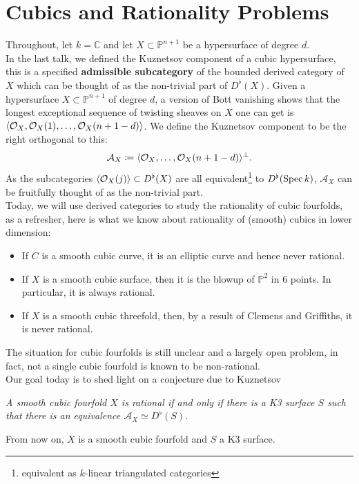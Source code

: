 \section{Cubics and Rationality Problems}
Throughout, let $k= \mathbb{C}$ and let $X \subset \mathbb{P}^{n+1}$ be a hypersurface of degree $d$.\\
In the last talk, we defined the Kuznetsov component of a cubic hypersurface, this is a specified \textbf{admissible subcategory} of the bounded derived category of $X$ which can be thought of as the non-trivial part of $D^{\flat}( X) $.
Given a hypersurface $X \subset \mathbb{P}^{n+1}$ of degree $d$, a version of Bott vanishing shows that the longest exceptional sequence of twisting sheaves on $X$ one can get is $\left\langle \mathcal{O}_X, \mathcal{O}_X( 1), \ldots, \mathcal{O}_X( n+1-d)\right\rangle  $. 
We define the Kuznetsov component to be the right orthogonal to this:
\[ 
\mathcal{A}_X \coloneq \langle \mathcal{O}_X,\ldots, \mathcal{O}_X( n+1-d) \rangle^{\perp}.
\]
As the subcategories $ \langle \mathcal{O}_X( j) \rangle \subset D^{\flat}( X) $ are all equivalent\footnote{equivalent as $k$-linear triangulated categories} to $D^{\flat}( \operatorname{Spec} k) $, $\mathcal{A}_X$ can be fruitfully thought of as the non-trivial part.\\
Today, we will use derived categories to study the rationality of cubic fourfolds, as a refresher, here is what we know about rationality of (smooth) cubics in lower dimension:
\begin{itemize}
\item If $C$ is a smooth cubic curve, it is an elliptic curve and hence never rational.
\item If $X$ is a smooth cubic surface, then it is the blowup of $\mathbb{P}^{2}$ in 6 points. In particular, it is always rational.
\item If $X$ is a smooth cubic threefold, then, by a result of Clemens and Griffiths, it is never rational.
\end{itemize}
The situation for cubic fourfolds is still unclear and a largely open problem, in fact, not a single cubic fourfold is known to be non-rational.\\
Our goal today is to shed light on a conjecture due to Kuznetsov
\begin{center}
	\textit{A smooth cubic fourfold $X$  is rational if and only if there is a K3 surface $S$ such that there is an equivalence $\mathcal{A}_X\simeq D^{\flat}( S) $.}
\end{center}
From now on, $X$ is a smooth cubic fourfold and $S$ a K3 surface.\\
